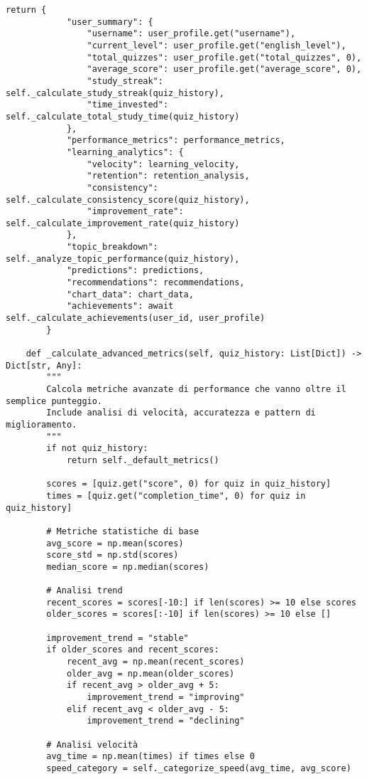 \documentclass[a4paper, 14pt, oneside]{extbook}
\begin{document}
\begin{lstlisting}[style=pythonstyle, caption=Sistema Analytics Avanzato, label=lst:analytics-engine]
        return {
            "user_summary": {
                "username": user_profile.get("username"),
                "current_level": user_profile.get("english_level"),
                "total_quizzes": user_profile.get("total_quizzes", 0),
                "average_score": user_profile.get("average_score", 0),
                "study_streak": self._calculate_study_streak(quiz_history),
                "time_invested": self._calculate_total_study_time(quiz_history)
            },
            "performance_metrics": performance_metrics,
            "learning_analytics": {
                "velocity": learning_velocity,
                "retention": retention_analysis,
                "consistency": self._calculate_consistency_score(quiz_history),
                "improvement_rate": self._calculate_improvement_rate(quiz_history)
            },
            "topic_breakdown": self._analyze_topic_performance(quiz_history),
            "predictions": predictions,
            "recommendations": recommendations,
            "chart_data": chart_data,
            "achievements": await self._calculate_achievements(user_id, user_profile)
        }
    
    def _calculate_advanced_metrics(self, quiz_history: List[Dict]) -> Dict[str, Any]:
        """
        Calcola metriche avanzate di performance che vanno oltre il semplice punteggio.
        Include analisi di velocità, accuratezza e pattern di miglioramento.
        """
        if not quiz_history:
            return self._default_metrics()
        
        scores = [quiz.get("score", 0) for quiz in quiz_history]
        times = [quiz.get("completion_time", 0) for quiz in quiz_history]
        
        # Metriche statistiche di base
        avg_score = np.mean(scores)
        score_std = np.std(scores)
        median_score = np.median(scores)
        
        # Analisi trend
        recent_scores = scores[-10:] if len(scores) >= 10 else scores
        older_scores = scores[:-10] if len(scores) >= 10 else []
        
        improvement_trend = "stable"
        if older_scores and recent_scores:
            recent_avg = np.mean(recent_scores)
            older_avg = np.mean(older_scores)
            if recent_avg > older_avg + 5:
                improvement_trend = "improving"
            elif recent_avg < older_avg - 5:
                improvement_trend = "declining"
        
        # Analisi velocità
        avg_time = np.mean(times) if times else 0
        speed_category = self._categorize_speed(avg_time, avg_score)
        

\end{lstlisting}
\end{document}
